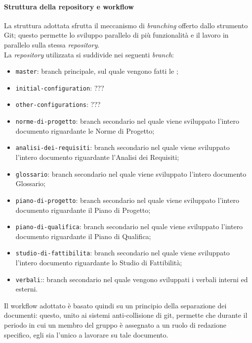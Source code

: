 \documentclass[../norme-di-progetto.tex]{subfiles}
\begin{document}
\paragraph{Struttura della repository e workflow}
La struttura adottata sfrutta il meccanismo di \textit{branching} offerto dallo strumento Git; questo permette lo sviluppo parallelo di più funzionalità e il lavoro in parallelo sulla stessa \textit{repository}. \\
La \textit{repository} utilizzata si suddivide nei seguenti \textit{branch}:
\begin{itemize}
  \item \texttt{master}: branch principale, sul quale vengono fatti le ;
  \item \texttt{initial-configuration}: ???
  \item \texttt{other-configurations}: ???
  \item \texttt{norme-di-progetto}: branch secondario nel quale viene sviluppato l'intero documento riguardante le Norme di Progetto;
  \item \texttt{analisi-dei-requisiti}: branch secondario nel quale viene sviluppato l'intero documento riguardante l'Analisi dei Requisiti;
  \item \texttt{glossario}: branch secondario nel quale viene sviluppato l'intero documento Glossario;
  \item \texttt{piano-di-progetto}: branch secondario nel quale viene sviluppato l'intero documento riguardante il Piano di Progetto;
  \item \texttt{piano-di-qualifica}: branch secondario nel quale viene sviluppato l'intero documento riguardante il Piano di Qualifica;
  \item \texttt{studio-di-fattibilita}: branch secondario nel quale viene sviluppato l'intero documento riguardante lo Studio di Fattibilità;
  \item \texttt{verbali}:: branch secondario nel quale vengono sviluppati i verbali interni ed esterni.
\end{itemize}
Il workflow adottato è basato quindi su un principio della separazione dei documenti: questo, unito ai sistemi anti-collisione di git, permette che durante il periodo in cui un membro del gruppo è assegnato a un ruolo di redazione specifico, egli sia l'unico a lavorare su tale documento.
\end{document}
